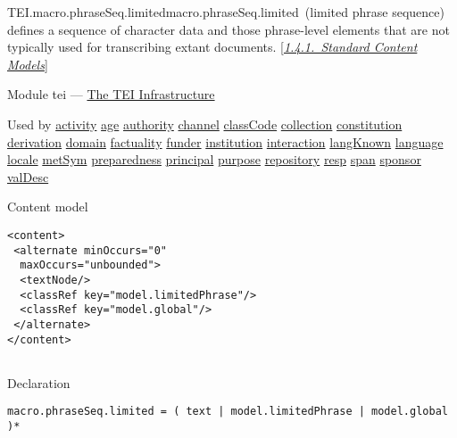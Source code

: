 \begin{reflist}
\item[]\begin{specHead}{TEI.macro.phraseSeq.limited}{macro.phraseSeq.limited} (limited phrase sequence) defines a sequence of character data and those phrase-level elements that are not typically used for transcribing extant documents. [\textit{\hyperref[STECST]{1.4.1.\ Standard Content Models}}]\end{specHead} 
    \item[{Module}]
  tei — \hyperref[ST]{The TEI Infrastructure}
    \item[{Used by}]
  \hyperref[TEI.activity]{activity} \hyperref[TEI.age]{age} \hyperref[TEI.authority]{authority} \hyperref[TEI.channel]{channel} \hyperref[TEI.classCode]{classCode} \hyperref[TEI.collection]{collection} \hyperref[TEI.constitution]{constitution} \hyperref[TEI.derivation]{derivation} \hyperref[TEI.domain]{domain} \hyperref[TEI.factuality]{factuality} \hyperref[TEI.funder]{funder} \hyperref[TEI.institution]{institution} \hyperref[TEI.interaction]{interaction} \hyperref[TEI.langKnown]{langKnown} \hyperref[TEI.language]{language} \hyperref[TEI.locale]{locale} \hyperref[TEI.metSym]{metSym} \hyperref[TEI.preparedness]{preparedness} \hyperref[TEI.principal]{principal} \hyperref[TEI.purpose]{purpose} \hyperref[TEI.repository]{repository} \hyperref[TEI.resp]{resp} \hyperref[TEI.span]{span} \hyperref[TEI.sponsor]{sponsor} \hyperref[TEI.valDesc]{valDesc}
    \item[{Content model}]
  \mbox{}\hfill\\[-10pt]\begin{Verbatim}[fontsize=\small]
<content>
 <alternate minOccurs="0"
  maxOccurs="unbounded">
  <textNode/>
  <classRef key="model.limitedPhrase"/>
  <classRef key="model.global"/>
 </alternate>
</content>
    
\end{Verbatim}

    \item[{Declaration}]
  \mbox{}\hfill\\[-10pt]\begin{Verbatim}[fontsize=\small]
macro.phraseSeq.limited = ( text | model.limitedPhrase | model.global )*
\end{Verbatim}

\end{reflist}  
